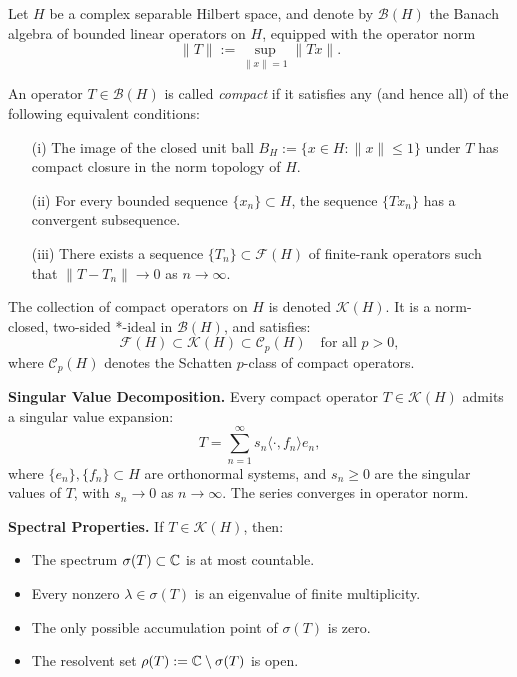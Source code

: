 \begin{definition}\label{def:compact_operator}
Let \( H \) be a complex separable Hilbert space, and denote by \( \mathcal{B}(H) \) the Banach algebra of bounded linear operators on \( H \), equipped with the operator norm
\[
\|T\| := \sup_{\|x\| = 1} \|Tx\|.
\]

An operator \( T \in \mathcal{B}(H) \) is called \emph{compact} if it satisfies any (and hence all) of the following equivalent conditions:
\begin{enumerate}
    \item[\textup{(i)}] The image of the closed unit ball \( B_H := \{ x \in H : \|x\| \leq 1 \} \) under \( T \) has compact closure in the norm topology of \( H \).
    \item[\textup{(ii)}] For every bounded sequence \( \{x_n\} \subset H \), the sequence \( \{Tx_n\} \) has a convergent subsequence.
    \item[\textup{(iii)}] There exists a sequence \( \{T_n\} \subset \mathcal{F}(H) \) of finite-rank operators such that \( \|T - T_n\| \to 0 \) as \( n \to \infty \).
\end{enumerate}

The collection of compact operators on \( H \) is denoted \( \mathcal{K}(H) \). It is a norm-closed, two-sided *-ideal in \( \mathcal{B}(H) \), and satisfies:
\[
\mathcal{F}(H) \subset \mathcal{K}(H) \subset \mathcal{C}_p(H) \quad \text{for all } p > 0,
\]
where \( \mathcal{C}_p(H) \) denotes the Schatten \( p \)-class of compact operators.

\medskip
\noindent\textbf{Singular Value Decomposition.}
Every compact operator \( T \in \mathcal{K}(H) \) admits a singular value expansion:
\[
T = \sum_{n=1}^\infty s_n \langle \cdot, f_n \rangle e_n,
\]
where \( \{e_n\}, \{f_n\} \subset H \) are orthonormal systems, and \( s_n \geq 0 \) are the singular values of \( T \), with \( s_n \to 0 \) as \( n \to \infty \). The series converges in operator norm.

\medskip
\noindent\textbf{Spectral Properties.}
If \( T \in \mathcal{K}(H) \), then:
\begin{itemize}
    \item The spectrum \( \sigma(T) \subset \mathbb{C} \) is at most countable.
    \item Every nonzero \( \lambda \in \sigma(T) \) is an eigenvalue of finite multiplicity.
    \item The only possible accumulation point of \( \sigma(T) \) is zero.
    \item The resolvent set \( \rho(T) := \mathbb{C} \setminus \sigma(T) \) is open.
\end{itemize}


\end{definition}
